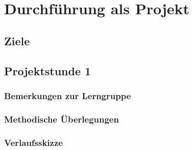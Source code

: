 \section{Durchführung als Projekt}
\subsection{Ziele}
\subsection{Projektstunde 1}
\subsubsection{Bemerkungen zur Lerngruppe}
\subsubsection{Methodische Überlegungen}
\subsubsection{Verlaufsskizze}